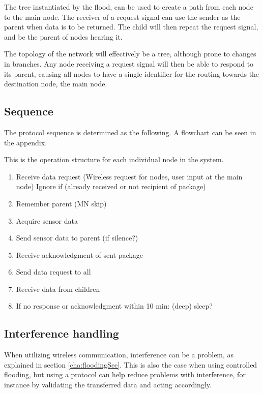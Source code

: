 The tree instantiated by the flood, can be used to create a path from each node to the main node.
The receiver of a request signal can use the sender as the parent when data is to be returned.
The child will then repeat the request signal, and be the parent of nodes hearing it.

The topology of the network will effectively be a tree, although prone to changes in branches.
Any node receiving a request signal will then be able to respond to its parent, causing all nodes to have a single identifier for the routing towards the destination node, the main node.

\subsection{Sequence}
The protocol sequence is determined as the following. A flowchart can be seen in the appendix.

This is the operation structure for each individual node in the system.
\begin{enumerate}
	\item Receive data request (Wireless request for nodes, user input at the main node)
	\subitem Ignore if (already received or not recipient of package)
	\item Remember parent (MN skip)
	\item Acquire sensor data
	\item Send sensor data to parent (if silence?)
	\item Receive acknowledgment of sent package
	\item Send data request to all
	\item Receive data from children
	\item If no response or acknowledgment within 10 min: (deep) sleep?
\end{enumerate}

\subsection{Interference handling} \label{cha:crcDesign}
When utilizing wireless communication, interference can be a problem, as explained in section \ref{cha:floodingSec}. This is also the case when using controlled flooding, but using a protocol can help reduce problems with interference, for instance by validating the transferred data and acting accordingly.

